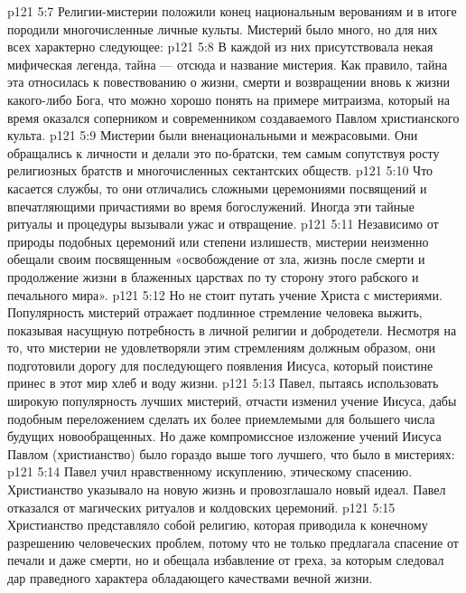 \vs p121 5:7 \pc Религии\hyp{}мистерии положили конец национальным верованиям и в итоге породили многочисленные личные культы. Мистерий было много, но для них всех характерно следующее:
\vs p121 5:8 \bibnobreakspace В каждой из них присутствовала некая мифическая легенда, тайна --- отсюда и название мистерия. Как правило, тайна эта относилась к повествованию о жизни, смерти и возвращении вновь к жизни какого\hyp{}либо Бога, что можно хорошо понять на примере митраизма, который на время оказался соперником и современником создаваемого Павлом христианского культа.
\vs p121 5:9 \bibnobreakspace Мистерии были вненациональными и межрасовыми. Они обращались к личности и делали это по\hyp{}братски, тем самым сопутствуя росту религиозных братств и многочисленных сектантских обществ.
\vs p121 5:10 \bibnobreakspace Что касается службы, то они отличались сложными церемониями посвящений и впечатляющими причастиями во время богослужений. Иногда эти тайные ритуалы и процедуры вызывали ужас и отвращение.
\vs p121 5:11 \bibnobreakspace Независимо от природы подобных церемоний или степени излишеств, мистерии неизменно обещали своим посвященным  «освобождение от зла, жизнь после смерти и продолжение жизни в блаженных царствах по ту сторону этого рабского и печального мира».
\vs p121 5:12 \pc Но не стоит путать учение Христа с мистериями. Популярность мистерий отражает подлинное стремление человека выжить, показывая насущную потребность в личной религии и добродетели. Несмотря на то, что мистерии не удовлетворяли этим стремлениям должным образом, они подготовили дорогу для последующего появления Иисуса, который поистине принес в этот мир хлеб и воду жизни.
\vs p121 5:13 Павел, пытаясь использовать широкую популярность лучших мистерий, отчасти изменил учение Иисуса, дабы подобным переложением сделать их более приемлемыми для большего числа будущих новообращенных. Но даже компромиссное изложение учений Иисуса Павлом (христианство) было гораздо выше того лучшего, что было в мистериях:
\vs p121 5:14 \bibnobreakspace Павел учил нравственному искуплению, этическому спасению. Христианство указывало на новую жизнь и провозглашало новый идеал. Павел отказался от магических ритуалов и колдовских церемоний.
\vs p121 5:15 \bibnobreakspace Христианство представляло собой религию, которая приводила к конечному разрешению человеческих проблем, потому что не только предлагала спасение от печали и даже смерти, но и обещала избавление от греха, за которым следовал дар праведного характера обладающего качествами вечной жизни.
